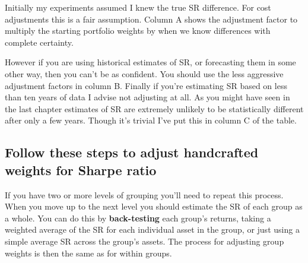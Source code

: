 Initially my experiments assumed I knew the true SR difference. For cost adjustments this is a fair assumption. Column A shows the adjustment factor to multiply the starting portfolio weights by when we know differences with complete certainty.

However if you are using historical estimates of SR, or forecasting them in some other way, then you can't be as confident. You should use the less aggressive adjustment factors in column B. Finally if you're estimating SR based on less than ten years of data I advise not adjusting at all. As you might have seen in the last chapter estimates of SR are extremely unlikely to be statistically different after only a few years. Though it's trivial I've put this in column C of the table.

\subsection*{Follow these steps to adjust handcrafted weights for Sharpe ratio}


If you have two or more levels of grouping you'll need to repeat this process. When you move up to the next level you should estimate the SR of each group as a whole. You can do this by \textbf{back-testing} each group's returns, taking a weighted average of the SR for each individual asset in the group, or just using a simple average SR across the group's assets. The process for adjusting group weights is then the same as for within groups.

